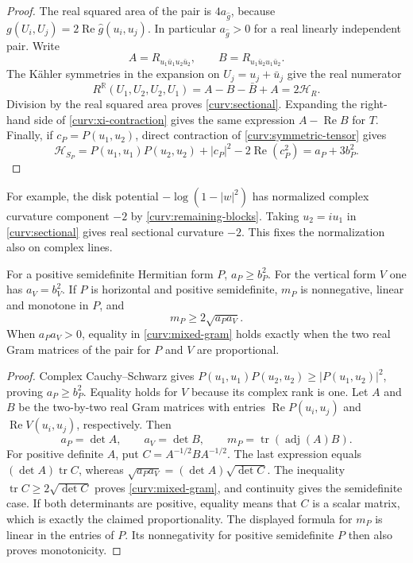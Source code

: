 \begin{proof}
The real squared area of the pair is $4a_{\widehat g}$, because
$g(U_i,U_j)=2\operatorname{Re}\widehat g(u_i,u_j)$.
In particular $a_{\widehat g}>0$ for a real linearly independent
pair.  Write
\[
 A=R_{u_1\bar u_1u_2\bar u_2},\qquad
 B=R_{u_1\bar u_2u_1\bar u_2}.
\]
The K\"ahler symmetries in the expansion on
$U_j=u_j+\bar u_j$ give the real numerator
\[
 R^{\mathbb R}(U_1,U_2,U_2,U_1)
      =A-B-\bar B+A=2\mathcal H_R.
\]
Division by the real squared area proves \eqref{curv:sectional}.
Expanding the right-hand side of \eqref{curv:xi-contraction}
gives the same expression $A-\operatorname{Re}B$ for $T$.
Finally, if $c_P=P(u_1,u_2)$, direct contraction of
\eqref{curv:symmetric-tensor} gives
\[
 \mathcal H_{S_P}
   =P(u_1,u_1)P(u_2,u_2)+|c_P|^2-2\operatorname{Re}(c_P^2)
   =a_P+3b_P^2.
\]
\end{proof}

For example, the disk potential $-\log(1-|w|^2)$ has normalized
complex curvature component $-2$ by
\eqref{curv:remaining-blocks}.  Taking $u_2=iu_1$ in
\eqref{curv:sectional} gives real sectional curvature $-2$.
This fixes the normalization also on complex lines.

\begin{lemma}\label{curv:gram}
For a positive semidefinite Hermitian form $P$,
$a_P\ge b_P^2$.  For the vertical form $V$ one has $a_V=b_V^2$.
If $P$ is horizontal and positive semidefinite, $m_P$ is nonnegative,
linear and monotone in $P$, and
\begin{equation}\label{curv:mixed-gram}
 m_P\ge2\sqrt{a_Pa_V}.
\end{equation}
When $a_Pa_V>0$, equality in \eqref{curv:mixed-gram} holds exactly
when the two real Gram matrices of the pair for $P$ and $V$ are
proportional.
\end{lemma}

\begin{proof}
Complex Cauchy--Schwarz gives
$P(u_1,u_1)P(u_2,u_2)\ge|P(u_1,u_2)|^2$, proving
$a_P\ge b_P^2$.  Equality holds for $V$ because its complex rank
is one.
Let $A$ and $B$ be the two-by-two real Gram matrices with entries
$\operatorname{Re}P(u_i,u_j)$ and
$\operatorname{Re}V(u_i,u_j)$, respectively.  Then
\[
 a_P=\det A,\qquad a_V=\det B,\qquad
 m_P=\operatorname{tr}(\operatorname{adj}(A)B).
\]
For positive definite $A$, put $C=A^{-1/2}BA^{-1/2}$.
The last expression equals $(\det A)\operatorname{tr}C$,
whereas $\sqrt{a_Pa_V}=(\det A)\sqrt{\det C}$.
The inequality $\operatorname{tr}C\ge2\sqrt{\det C}$ proves
\eqref{curv:mixed-gram}, and continuity gives the semidefinite
case.  If both determinants are positive, equality means that
$C$ is a scalar matrix, which is exactly the claimed proportionality.
The displayed formula for $m_P$ is linear in the entries of $P$.
Its nonnegativity for positive semidefinite $P$ then also proves
monotonicity.
\end{proof}

